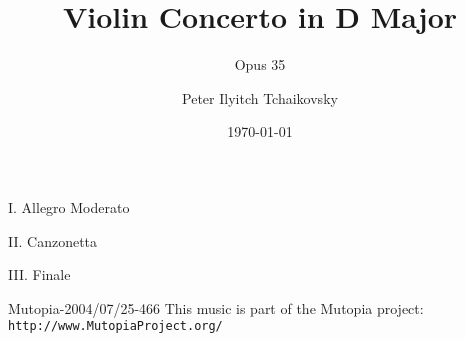 \documentclass[a4paper]{opera}
\begin{document}
     
     
     \def\preLilyPondExample{\def\mustmakelilypondtitle{}}
     
     \title {Violin Concerto in D Major}
     \subtitle {Opus 35}
     \author {Peter Ilyitch Tchaikovsky}
     \date {\today}
     \maketitle
     
     \begin{center}
     {\huge{I. Allegro Moderato}} \\
     \end{center}
     \clearpage
     
     \begin{center}
     {\huge{II. Canzonetta}} \\
     \end{center}
     \clearpage
     
     \begin{center}
     {\huge{III. Finale}} \\
     \end{center}
     
     \vspace{3cm}
     
     \parbox{\hsize}{\thefooter\quad\small\noindent Mutopia-2004/07/25-466  This music is part of the Mutopia project:  \texttt{http://www.MutopiaProject.org/}\\  }
     
     
\end{document}
